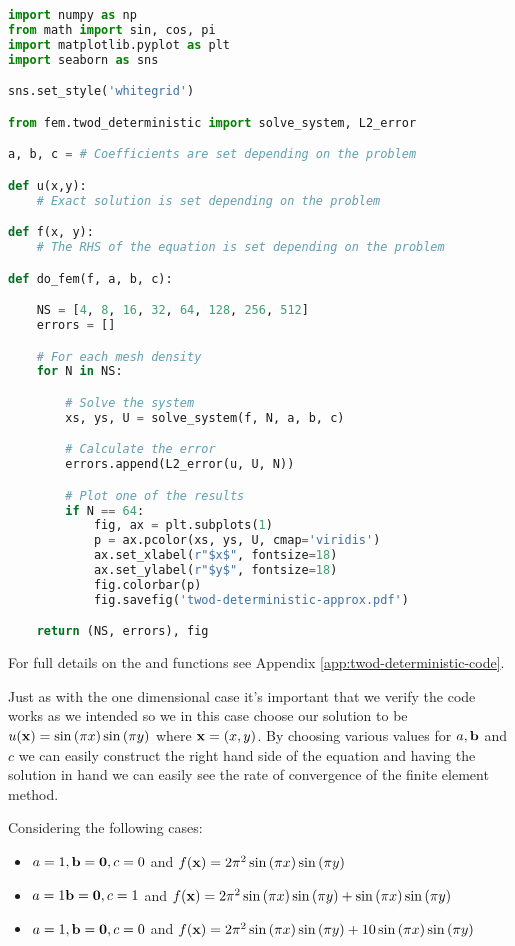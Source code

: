 \begin{lstlisting}[language=Python,
                   caption={Setup code for the 2D Deterministic Finite Element
                            Method},
                   label={code:twod-deterministic}]
import numpy as np
from math import sin, cos, pi
import matplotlib.pyplot as plt
import seaborn as sns

sns.set_style('whitegrid')

from fem.twod_deterministic import solve_system, L2_error

a, b, c = # Coefficients are set depending on the problem

def u(x,y):
    # Exact solution is set depending on the problem

def f(x, y):
    # The RHS of the equation is set depending on the problem

def do_fem(f, a, b, c):

    NS = [4, 8, 16, 32, 64, 128, 256, 512]
    errors = []

    # For each mesh density
    for N in NS:

        # Solve the system
        xs, ys, U = solve_system(f, N, a, b, c)

        # Calculate the error
        errors.append(L2_error(u, U, N))

        # Plot one of the results
        if N == 64:
            fig, ax = plt.subplots(1)
            p = ax.pcolor(xs, ys, U, cmap='viridis')
            ax.set_xlabel(r"$x$", fontsize=18)
            ax.set_ylabel(r"$y$", fontsize=18)
            fig.colorbar(p)
            fig.savefig('twod-deterministic-approx.pdf')

    return (NS, errors), fig
\end{lstlisting}

For full details on the  and  functions
see Appendix \ref{app:twod-deterministic-code}.

Just as with the one dimensional case it's important that we verify the code
works as we intended so we in this case choose our solution to be
$u(\mathbf{x}) = \sin{(\pi x)}\sin{(\pi y)}$ where $\mathbf{x} = (x, y)$. By choosing
various values for $a, \mathbf{b}$ and $c$ we can easily construct the right hand
side of the equation and having the solution in hand we can easily see the rate
of convergence of the finite element method.

Considering the following cases:
\begin{itemize}
    \item $a = 1, \mathbf{b} = \mathbf{0}, c = 0$ and
          $f(\mathbf{x}) = 2\pi^2\sin{(\pi x)}\sin{(\pi y})$ \\
    \item $a = 1 \mathbf{b} = \mathbf{0}, c = 1$ and
          $f(\mathbf{x}) = 2\pi^2\sin{(\pi x)}\sin{(\pi y)} +
                \sin{(\pi x)}\sin{(\pi y)}$ \\
    \item $a = 1, \mathbf{b} = \mathbf{0}, c = 0$ and
          $f(\mathbf{x}) = 2\pi^2\sin{(\pi x)}\sin{(\pi y)} +
                10\sin{(\pi x)}\sin{(\pi y)}$
\end{itemize}

